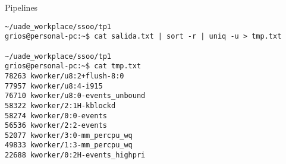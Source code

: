 \begin{section}{Pipelines}
\begin{lstlisting}[style=Ubuntu]
~/uade_workplace/ssoo/tp1
grios@personal-pc:~$ cat salida.txt | sort -r | uniq -u > tmp.txt  

~/uade_workplace/ssoo/tp1
grios@personal-pc:~$ cat tmp.txt 
78263 kworker/u8:2+flush-8:0
77957 kworker/u8:4-i915
76710 kworker/u8:0-events_unbound
58322 kworker/2:1H-kblockd
58274 kworker/0:0-events
56536 kworker/2:2-events
52077 kworker/3:0-mm_percpu_wq
49833 kworker/1:3-mm_percpu_wq
22688 kworker/0:2H-events_highpri
\end{lstlisting}

\end{section}